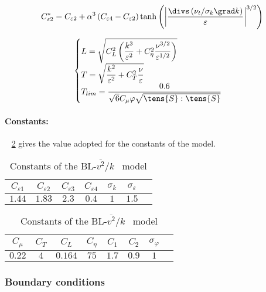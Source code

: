 \begin{equation}
         	C_{\varepsilon 2}^*=C_{\varepsilon 2}+ \alpha^3 \left( C_{\varepsilon 4}-C_{\varepsilon 2} \right) \tanh \left( \left| \frac{\divs \left(\nu_t/\sigma_k \grad k\right)}{\varepsilon} \right|^{3/2}   \right)
	\label{eq:turbul:blv2kcep2}
\end{equation}

\begin{equation}
	\label{eq:turbul:blv2kscales}
		\begin{cases}
			L = \sqrt{C_{L}^{2}\left(\dfrac{k^{3}}{\varepsilon^{2}}+C_{\eta}^{2}\dfrac{\nu^{3/2}}{\varepsilon^{1/2}}\right)} & \\
			T = \sqrt{\dfrac{k^{2}}{\varepsilon^{2}}+C_{T}^{2}\dfrac{\nu}{\varepsilon}} & \\
			T_{lim} = \dfrac{0.6}{\sqrt{6}C_\mu \varphi \sqrt{\tens{S} : \tens{S}}}
		\end{cases}
\end{equation}

\paragraph{Constants:}
\tablename~ \ref{tab:turbul:cstblv2k} gives the value adopted for the constants of the model.

\begin{table}[!htp]
\centering
\begin{tabular}{ccccccc}
	\hline
	$C_{\varepsilon 1}$ & $C_{\varepsilon 2}$ & $C_{\varepsilon 3} $ & $C_{\varepsilon 4}$ & $\sigma_k$ & $\sigma_{\varepsilon}$\\
	\hline
	$ 1.44 $ & $1.83$ & $2.3$ & $0.4$ & $1$ & $1.5$ \\
	\hline
\end{tabular}

\begin{tabular}{cccccccc}
	\hline
	 $C_\mu$ & $C_T$ & $C_{L}$ & $C_{\eta}$ & $C_1$ & $C_2$ & $\sigma_\varphi$\\
	\hline
	 $0.22$ & $4$ & $0.164$ & $75$ & $1.7$ & $0.9$  &  $1$ \\
	\hline
\end{tabular}
\caption{\label{tab:turbul:cstblv2k} Constants of the BL-$\overline{v^2}/k$~ model}
\end{table}

\subsubsection{Boundary conditions}

